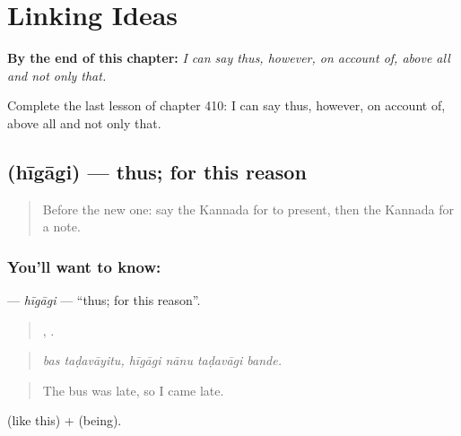 
\chapter{Linking Ideas}
\label{ch:ka-linking-ideas}

\begin{chapteropening}
\textbf{By the end of this chapter:} \emph{I can say thus, however, on account of, above all and not only that.}

Complete the last lesson of chapter 410: I can say thus, however, on account of, above all and not only that.
\end{chapteropening}

\section[\texorpdfstring{\kn{ಹೀಗಾಗಿ} (hīgāgi)}{ಹೀಗಾಗಿ (hīgāgi)}]{ (hīgāgi) — thus; for this reason}

\label{lesson:KA-C410-higagi}



\begin{quote}
Before the new one: say the Kannada for to present, then the Kannada for a note.
\end{quote}

\subsection*{You'll want to know: }
\textbf{} — \emph{hīgāgi} — \textquotedblleft{}thus; for this reason\textquotedblright{}.

\begin{quote}
 ,    .
\end{quote}

\begin{quote}
\emph{bas taḍavāyitu, hīgāgi nānu taḍavāgi bande.}
\end{quote}

\begin{quote}
The bus was late, so I came late.
\end{quote}

 (like this) +  (being).

